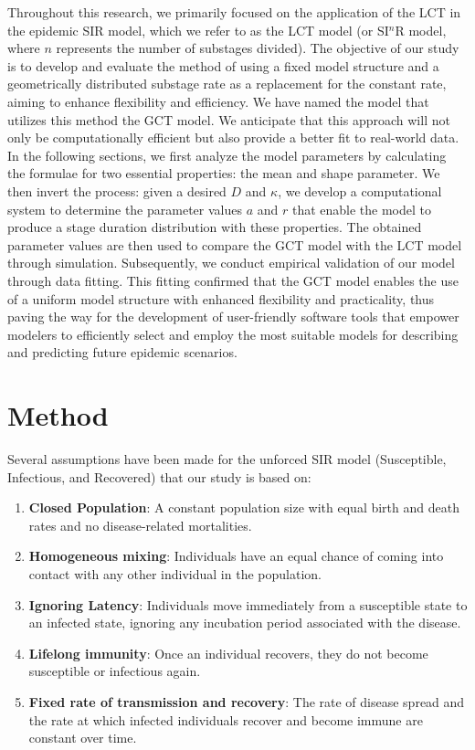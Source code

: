 \documentclass[12pt]{article}
\begin{document}
Throughout this research, we primarily focused on the application of the LCT in the epidemic SIR model, which we refer to as the LCT model (or SI$^n$R model, where $n$ represents the number of substages divided). The objective of our study is to develop and evaluate the method of using a fixed model structure and a geometrically distributed substage rate as a replacement for the constant rate, aiming to enhance flexibility and efficiency. We have named the model that utilizes this method the GCT model. We anticipate that this approach will not only be computationally efficient but also provide a better fit to real-world data. In the following sections, we first analyze the model parameters by calculating the formulae for two essential properties: the mean and shape parameter. We then invert the process: given a desired $D$ and $\kappa$, we develop a computational system to determine the parameter values $a$ and $r$ that enable the model to produce a stage duration distribution with these properties. The obtained parameter values are then used to compare the GCT model with the LCT model through simulation. Subsequently, we conduct empirical validation of our model through data fitting. This fitting confirmed that the GCT model enables the use of a uniform model structure with enhanced flexibility and practicality, thus paving the way for the development of user-friendly software tools that empower modelers to efficiently select and employ the most suitable models for describing and predicting future epidemic scenarios.


\section{Method}
Several assumptions have been made for the unforced SIR model (Susceptible, Infectious, and Recovered) that our study is based on: 
\begin{enumerate}
    \item \textbf{Closed Population}: A constant population size with equal birth and death rates and no disease-related mortalities.
    \item \textbf{Homogeneous mixing}: Individuals have an equal chance of coming into contact with any other individual in the population. 
    \item \textbf{Ignoring Latency}: Individuals move immediately from a susceptible state to an infected state, ignoring any incubation period associated with the disease.
    \item \textbf{Lifelong immunity}: Once an individual recovers, they do not become susceptible or infectious again.
    \item \textbf{Fixed rate of transmission and recovery}: The rate of disease spread and the rate at which infected individuals recover and become immune are constant over time.
\end{enumerate}
\end{document}
